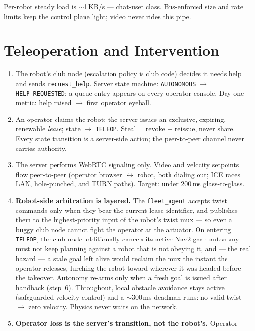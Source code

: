 \documentclass[11pt]{article}
\begin{document}
Per-robot steady load is $\sim$1\,KB/s --- chat-user class. Bus-enforced size and rate
limits keep the control plane light; video never rides this pipe.

\section{Teleoperation and Intervention}
\label{sec:teleop}

\begin{enumerate}[itemsep=1pt]
  \item The robot's club node (escalation policy is club code) decides it needs help
        and sends \texttt{request\_help}. Server state machine: \texttt{AUTONOMOUS}
        $\to$ \texttt{HELP\_REQUESTED}; a queue entry appears on every operator
        console. Day-one metric: help raised $\to$ first operator eyeball.
  \item An operator claims the robot; the server issues an exclusive, expiring,
        renewable \emph{lease}; state $\to$ \texttt{TELEOP}. Steal = revoke + reissue,
        never share. Every state transition is a server-side action; the peer-to-peer
        channel never carries authority.
  \item The server performs WebRTC signaling only. Video and velocity setpoints flow
        peer-to-peer (operator browser $\leftrightarrow$ robot, both dialing out; ICE
        races LAN, hole-punched, and TURN paths). Target: under 200\,ms
        glass-to-glass.
  \item \textbf{Robot-side arbitration is layered.} The \texttt{fleet\_agent} accepts
        twist commands only when they bear the current lease identifier, and
        publishes them to the highest-priority input of the robot's twist mux --- so
        even a buggy club node cannot fight the operator at the actuator. On entering
        \texttt{TELEOP}, the club node additionally cancels its active Nav2 goal:
        autonomy must not keep planning against a robot that is not obeying it, and
        --- the real hazard --- a stale goal left alive would reclaim the mux the
        instant the operator releases, lurching the robot toward wherever it was
        headed before the takeover. Autonomy re-arms only when a fresh goal is issued
        after handback (step~6). Throughout, local obstacle avoidance stays active
        (safeguarded velocity control) and a $\sim$300\,ms deadman runs: no valid
        twist $\to$ zero velocity. Physics never waits on the network.
  \item \textbf{Operator loss is the server's transition, not the robot's.} Operator

\end{enumerate}
\end{document}
